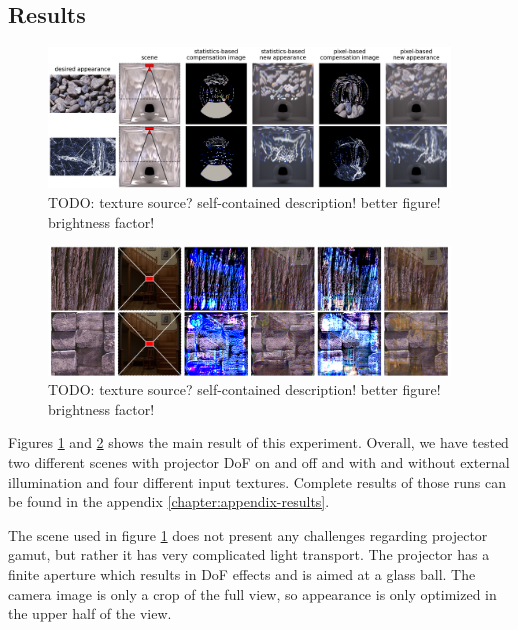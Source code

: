 \subsection{Results}
\label{section:results-experiments-03-results}

\begin{figure}[ht]
    \begin{center}
        \includegraphics[width=0.95\textwidth]{images/ex03-ball-dof-crop.png}
        \caption{{\color{red} TODO: texture source? self-contained description! better figure! brightness factor!}}
        \label{fig:ex03-ball-dof}
    \end{center}
\end{figure}

\begin{figure}[ht]
    \begin{center}
        \includegraphics[width=0.95\textwidth]{images/ex03-staircase-illum-crop.png}
        \caption{{\color{red} TODO: texture source? self-contained description! better figure! brightness factor!}}
        \label{fig:ex03-staircase-illum}
    \end{center}
\end{figure}

Figures \ref{fig:ex03-ball-dof} and \ref{fig:ex03-staircase-illum} shows the main result of this experiment. Overall, we have tested two different scenes with projector DoF on and off and with and without external illumination and four different input textures. Complete results of those runs can be found in the appendix \ref{chapter:appendix-results}.

The scene used in figure \ref{fig:ex03-ball-dof} does not present any challenges regarding projector gamut, but rather it has very complicated light transport. The projector has a finite aperture which results in DoF effects and is aimed at a glass ball. The camera image is only a crop of the full view, so appearance is only optimized in the upper half of the view.

